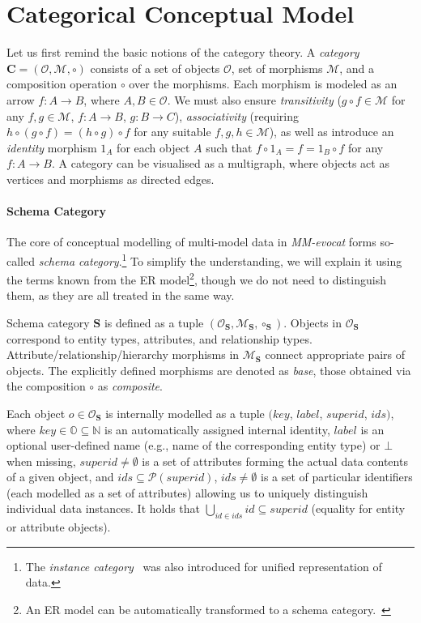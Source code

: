 \section{Categorical Conceptual Model}
Let us first remind the basic notions of the category theory.
A \textit{category} $\mathbf{C} = (\mathcal{O}, \mathcal{M}, \circ)$ consists of a set of objects $\mathcal{O}$, set of morphisms $\mathcal{M}$, and a composition operation $\circ$ over the morphisms. Each morphism is modeled as an arrow $f : A \rightarrow B$, where $A, B \in \mathcal{O}$. We must also ensure \textit{transitivity} ($g \circ f \in \mathcal{M}$ for any $f, g \in \mathcal{M}$, $f : A \rightarrow B$, $g : B \rightarrow C$), \textit{associativity} (requiring $h \circ (g \circ f) = (h \circ g) \circ f$ for any suitable $f, g, h \in \mathcal{M}$), as well as introduce an \textit{identity} morphism $1_A$ for each object $A$ such that $f \circ 1_A = f = 1_B \circ f$ for any $f : A \rightarrow B$. A category can be visualised as a multigraph, where objects act as vertices and morphisms as directed edges.


\paragraph{Schema Category}
The core of conceptual modelling of multi-model data in \textit{MM-evocat} forms so-called \textit{schema category}.\footnote{The \textit{instance category}~\citep{mm_cat_journal} was also introduced for  unified representation of data.}
To simplify the understanding, we will explain it using the terms known from the ER model\footnote{An ER model can be automatically transformed to a schema category.~\citep{DBLP:conf/ideas/HolubovaCS21a}}, though we do not need to distinguish them, as they are all treated in the same way.

Schema category $\mathbf{S}$ is defined as a tuple  $(\mathcal{O}_\mathbf{S}, \mathcal{M}_\mathbf{S}, \circ_\mathbf{S})$. Objects in $\mathcal{O}_\mathbf{S}$ correspond to entity types, attributes, and relationship types. Attribute/relationship/hierarchy morphisms in $\mathcal{M}_\mathbf{S}$ connect appropriate pairs of objects. The explicitly defined morphisms are denoted as \textit{base}, those obtained via the composition $\circ$ as \textit{composite}.


Each object $o \in \mathcal{O}_\mathbf{S}$ is internally modelled as a tuple $(key$, $label$, $superid$, $ids)$, where $key \in \mathbb{O} \subseteq \mathbb{N}$ is an automatically assigned internal identity, $label$ is an optional user-defined name (e.g., name of the corresponding entity type) or $\bot$ when missing, $superid \ne \emptyset$ is a set of attributes  forming the actual data contents of a given object, and $ids \subseteq \mathcal{P}(superid)$, $ids \ne \emptyset$ is a set of particular identifiers (each modelled as a set of attributes) allowing us to uniquely distinguish individual data instances. It holds that $\bigcup_{id \in ids} id \subseteq superid$ (equality for entity or attribute objects).

